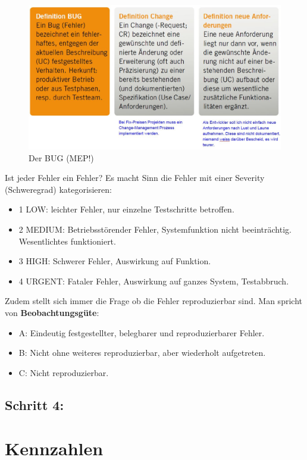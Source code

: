 \begin{figure}[h!]
\centering
\includegraphics[width=0.7\linewidth]{fig/der-bug}
\caption{Der BUG (MEP!)}
\label{fig:der-bug}
\end{figure}

Ist jeder Fehler ein Fehler? Es macht Sinn die Fehler mit einer Severity (Schweregrad) kategorisieren:
\begin{itemize}
	\item 1 LOW: leichter Fehler, nur einzelne Testschritte betroffen.
	\item 2 MEDIUM: Betriebsstörender Fehler, Systemfunktion nicht beeinträchtig. Wesentlichtes funktioniert.
	\item 3 HIGH: Schwerer Fehler, Auswirkung auf Funktion.
	\item 4 URGENT: Fataler Fehler, Auswirkung auf ganzes System, Testabbruch.
\end{itemize}

Zudem stellt sich immer die Frage ob die Fehler reproduzierbar sind. Man spricht von \textbf{Beobachtungsgüte}:
\begin{itemize}
	\item A: Eindeutig festgestellter, belegbarer und reproduzierbarer Fehler.
	\item B: Nicht ohne weiteres reproduzierbar, aber wiederholt aufgetreten.
	\item C: Nicht reproduzierbar.	
\end{itemize}

\subsection{Schritt 4:}


\section{Kennzahlen}

